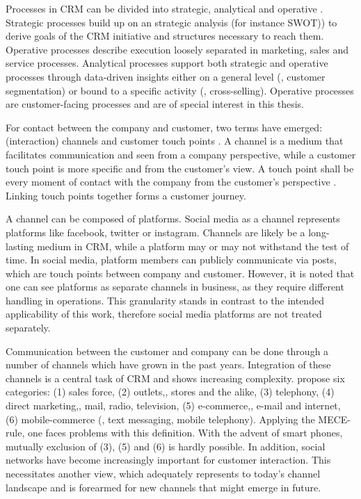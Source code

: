 		
		Processes in CRM can be divided into strategic, analytical and operative \citep{Neckel2005}. Strategic processes build up on an strategic analysis (for instance \acrshort{SWOT})) to derive goals of the CRM initiative and structures necessary to reach them. Operative processes describe execution loosely separated in marketing, sales and service processes. Analytical processes support both strategic and operative processes through data-driven insights either on a general level (\ie, customer segmentation) or bound to a specific activity (\ie, cross-selling). Operative processes are customer-facing processes and are of special interest in this thesis. 
		
		 For contact between the company and customer, two terms have emerged: (interaction) channels and customer touch points \citep{Leuer2011}. A channel is a medium that facilitates communication and seen from a company perspective, while a customer touch point is more specific and from the customer's view. A touch point shall be every moment of contact with the company from the customer's perspective \citep{Zomerdijk_2010}. Linking touch points together forms a customer journey. 
		 
		 A channel can be composed of platforms. Social media as a channel represents platforms like facebook, twitter or instagram. Channels are likely be a long-lasting medium in CRM, while a platform may or may not withstand the test of time. In social media, platform members can publicly communicate via posts, which are touch points between company and customer. 
		 However, it is noted that one can see platforms as separate channels in business, as they require different handling in operations. This granularity stands in contrast to the intended applicability of this work, therefore social media platforms are not treated separately. 
		
		Communication between the customer and company can be done through a number of channels which have grown in the past years. Integration of these channels is a central task of CRM and shows increasing complexity. \cite{paynefrow2005} propose six categories: (1) sales force, (2) outlets,\ie, stores and the alike, (3) telephony, (4) direct marketing,\ie , mail, radio, television, (5) e-commerce,\ie , e-mail and internet, (6) mobile-commerce (\ie, text messaging, mobile telephony). Applying the \acrfull{MECE}-rule, one faces problems with this definition. With the advent of smart phones, mutually exclusion of (3), (5) and (6) is hardly possible. In addition, social networks have become increasingly important for customer interaction. This necessitates another view, which adequately represents to today's channel landscape and is forearmed for new channels that might emerge in future. 
		
